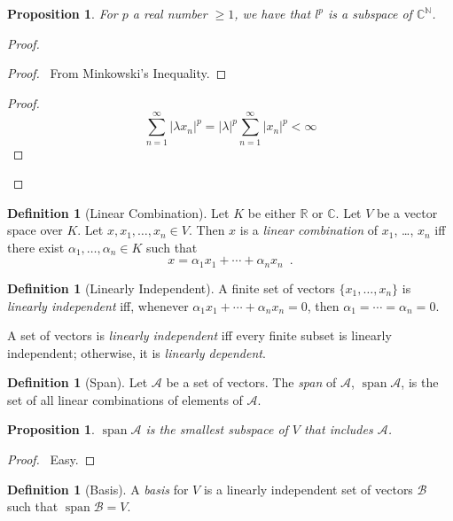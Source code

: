 \documentclass{book}
\let\qed\relax
\newtheorem{prop}[ax]{Proposition}
\theoremstyle{definition}
\newtheorem{df}[ax]{Definition}
\newcommand{\spn}{\ensuremath{\operatorname{span}}}
\begin{document}
\begin{prop}
For $p$ a real number $\geq 1$, we have that $l^p$ is a subspace of $\mathbb{C}^\mathbb{N}$.
\end{prop}

\begin{proof}
\pf
{}
\begin{proof}
	\pf\ From Minkowski's Inequality.
\end{proof}
\begin{proof}
	\pf
	\[ \sum_{n=1}^\infty |\lambda x_n|^p = |\lambda|^p \sum_{n=1}^\infty |x_n|^p < \infty \]
\end{proof}
\qed
\end{proof}

\begin{df}[Linear Combination]
Let $K$ be either $\mathbb{R}$ or $\mathbb{C}$. Let $V$ be a vector space over $K$. Let $x, x_1, \ldots, x_n \in V$. Then $x$ is a \emph{linear combination} of $x_1$, \ldots, $x_n$ iff there exist $\alpha_1, \ldots, \alpha_n \in K$ such that
\[ x = \alpha_1 x_1 + \cdots + \alpha_n x_n \enspace . \]
\end{df}

\begin{df}[Linearly Independent]
A finite set of vectors $\{x_1, \ldots, x_n\}$ is \emph{linearly independent} iff, whenever $\alpha_1 x_1 + \cdots + \alpha_n x_n = 0$, then $\alpha_1 = \cdots = \alpha_n = 0$.

A set of vectors is \emph{linearly independent} iff every finite subset is linearly independent; otherwise, it is \emph{linearly dependent}.
\end{df}

\begin{df}[Span]
Let $\mathcal{A}$ be a set of vectors. The \emph{span} of $\mathcal{A}$, $\spn \mathcal{A}$, is the set of all linear combinations of elements of $\mathcal{A}$.
\end{df}

\begin{prop}
$\spn \mathcal{A}$ is the smallest subspace of $V$ that includes $\mathcal{A}$.
\end{prop}

\begin{proof}
\pf\ Easy. \qed
\end{proof}

\begin{df}[Basis]
A \emph{basis} for $V$ is a linearly independent set of vectors $\mathcal{B}$ such that $\spn \mathcal{B} = V$.
\end{df}
\end{document}
